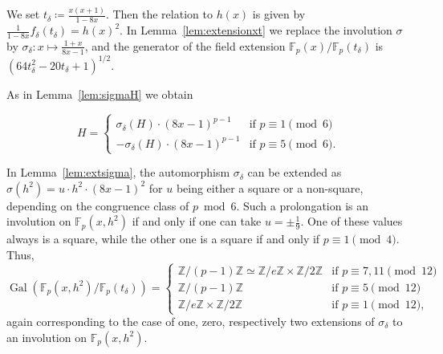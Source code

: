 \documentclass{article}
\newcommand{\Z}{\mathbb{Z}}
\newcommand{\F}{\mathbb{F}}
\DeclareMathOperator{\Gal}{Gal}
\theoremstyle{definition}
\theoremstyle{plain}
\theoremstyle{remark}
\begin{document}
We set $t_\delta\coloneqq \frac{x(x+1)}{1-8x}$. Then the relation to $h(x)$ is given by $\frac 1 {1-8x} f_\delta(t_\delta)=h(x)^2$. In Lemma~\ref{lem:extensionxt} we replace the involution $\sigma$ by $\sigma_\delta:x\mapsto \frac{1+x}{8x-1}$, and the generator of the field extension $\F_p(x)/\F_p(t_\delta)$ is $(64t_\delta^2-20t_\delta+1)^{1/2}$.

As in Lemma~\ref{lem:sigmaH} we obtain

\[H=\begin{cases}
        \sigma_\delta(H)\cdot (8x-1)^{p-1} & \text{if $p\equiv 1 \pmod 6$}\\ - \sigma_\delta(H)\cdot (8x-1)^{p-1} & \text{if $p\equiv 5 \pmod 6$.}
    \end{cases}\]

In Lemma~\ref{lem:extsigma}, the automorphism $\sigma_\delta$ can be extended as $\sigma(h^2)=u \cdot h^2 \cdot (8x-1)^2$ for $u$ being either a square or a non-square, depending on the congruence class of $p\bmod 6$. Such a prolongation is an involution on $\F_p(x, h^2)$ if and only if one can take $u=\pm \frac 1 9$. One of these values always is a square, while the other one is a square if and only if $p\equiv 1 \pmod 4$. Thus,  
    \[\Gal(\F_p(x, h^2)/\F_p(t_\delta)) = 
        \begin{cases}
            \Z/(p{-}1)\Z\simeq \Z/e\Z\times \Z/2\Z & \text{if } p\equiv 7, 11 \pmod{12}\\
            \Z/(p{-}1)\Z & \text{if } p\equiv 5 \pmod{12}\\
            \Z/e\Z\times \Z/2\Z& \text{if } p\equiv 1 \pmod{12},
        \end{cases}
    \]
again corresponding to the case of one, zero, respectively two extensions of $\sigma_\delta$ to an involution on $\F_p(x, h^2)$. 
\end{document}
